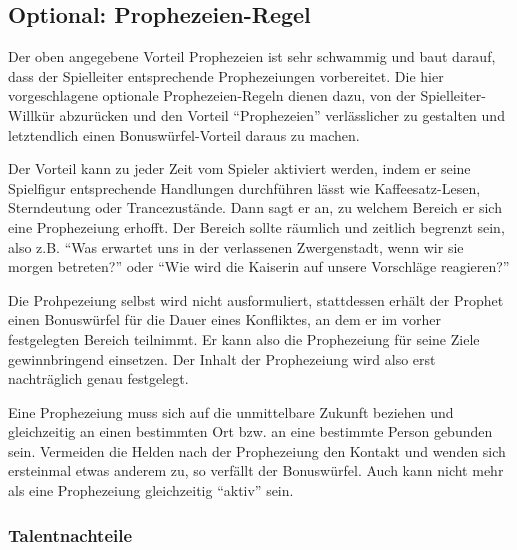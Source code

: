 \begin{optional}
\section{Optional: Prophezeien-Regel}
Der oben angegebene Vorteil Prophezeien ist sehr schwammig und baut darauf, dass der Spielleiter entsprechende Prophezeiungen vorbereitet. Die hier vorgeschlagene optionale Prophezeien-Regeln dienen dazu, von der Spielleiter-Willkür abzurücken und den Vorteil ``Prophezeien'' verlässlicher zu gestalten und letztendlich einen Bonuswürfel-Vorteil daraus zu machen.

Der Vorteil kann zu jeder Zeit vom Spieler aktiviert werden, indem er seine Spielfigur entsprechende Handlungen durchführen lässt wie Kaffeesatz-Lesen, Sterndeutung oder Trancezustände. Dann sagt er an, zu welchem Bereich er sich eine Prophezeiung erhofft. Der Bereich sollte räumlich und zeitlich begrenzt sein, also z.B. ``Was erwartet uns in der verlassenen Zwergenstadt, wenn wir sie morgen betreten?'' oder ``Wie wird die Kaiserin auf unsere Vorschläge reagieren?''

Die Prohpezeiung selbst wird nicht ausformuliert, stattdessen erhält der Prophet einen Bonuswürfel für die Dauer eines Konfliktes, an dem er im vorher festgelegten Bereich teilnimmt. Er kann also die Prophezeiung für seine Ziele gewinnbringend einsetzen. Der Inhalt der Prophezeiung wird also erst nachträglich genau festgelegt.

Eine Prophezeiung muss sich auf die unmittelbare Zukunft beziehen und gleichzeitig an einen bestimmten Ort bzw. an eine bestimmte Person gebunden sein. Vermeiden die Helden nach der Prophezeiung den Kontakt und wenden sich ersteinmal etwas anderem zu, so verfällt der Bonuswürfel. Auch kann nicht mehr als eine Prophezeiung gleichzeitig ``aktiv'' sein.
\end{optional}



\subsubsection{Talentnachteile}
\begin{description}
  \item[]
  \item[]
  \item[]
\end{description}

